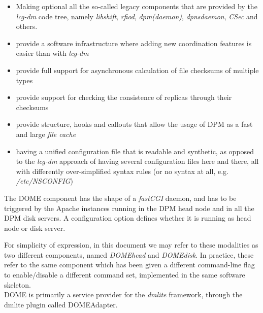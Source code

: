 \documentclass[a4paper,10pt]{scrreprt}
\begin{document}
\begin{itemize}
 \item Making optional all the so-called legacy components that are provided by the \textit{lcg-dm} code tree, namely \textit{libshift}, \textit{rfiod},
 \textit{dpm(daemon)}, \textit{dpnsdaemon}, \textit{CSec} and others.
 \item provide a software infrastructure where adding new coordination features is easier than with \textit{lcg-dm}
 \item provide full support for asynchronous calculation of file checksums of multiple types
 \item provide support for checking the consistence of replicas through their checksums
 \item provide structure, hooks and callouts that allow the usage of DPM as a fast and large \textit{file cache}
 \item having a unified configuration file that is readable and synthetic, as opposed to the \textit{lcg-dm} approach of having several configuration
 files here and there, all with differently over-simplified syntax rules (or no syntax at all, e.g. \textit{/etc/NSCONFIG})
\end{itemize}

The DOME component has the shape of a \textit{fastCGI} daemon, and has to be triggered by the Apache instances running in the DPM head node and
in all the DPM disk servers. A configuration option defines whether it is running as head node or disk server.

For simplicity of expression, in this document we may refer to these modalities as two different components, named \textit{DOMEhead} and \textit{DOMEdisk}.
In practice, these refer to the same component which has been given a different command-line flag to enable/disable a different command set,
implemented in the same software skeleton.\\

DOME is primarily a service provider for the \textit{dmlite} framework, through the dmlite plugin called DOMEAdapter.\\
\end{document}
